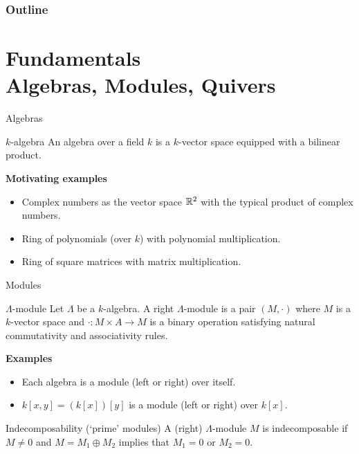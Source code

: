 \begin{frame}
 \frametitle{Outline}
 \tableofcontents
\end{frame}

\section{Fundamentals \\ \normalsize \textcolor{black!60!bgcolorAlt}{Algebras, Modules, Quivers}}

\begin{frame}{Algebras}
 \begin{alertblock}{$k$-algebra}
 	An algebra over a field $k$ is a $k$-vector space equipped with a
 	\alert{bilinear product}.
 \end{alertblock}
 \pause
 \textbf{Motivating examples}
 \begin{itemize}
  \item Complex numbers as the vector space $\mathbb{R}^2$ with the typical product of
   complex numbers.
  \pause
 	\item Ring of polynomials (over $k$) with polynomial multiplication.
 	\pause
 	\item Ring of square matrices with matrix multiplication.
 \end{itemize}
\end{frame}

\begin{frame}{Modules}
 \begin{alertblock}{$\Lambda$-module}
  Let $\Lambda$ be a $k$-algebra. A right $\Lambda$-module is a pair $(M, \cdot
  )$ where $M$ is a $k$-vector space and $ \cdot :M \times A \to M$ is a binary
  operation satisfying natural commutativity and associativity rules.
 \end{alertblock}
 \pause
 \textbf{Examples}
 \begin{itemize}
  \item Each algebra is a module (left or right) over itself.
  \pause 
 	 \item $k[x,y] = (k[x])[y]$ is a module (left or right) over $k[x]$.
 \end{itemize}
 \pause
 \begin{block}{Indecomposability (`prime' modules)}
 	A (right) $\Lambda$-module $M$ is \alert{indecomposable} if $M \neq 0$ and $M
 	= M_1 \oplus M_2$ implies that $M_1 = 0$ or $M_2 = 0$.
 \end{block}
\end{frame}

